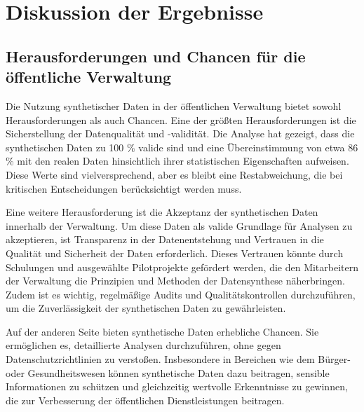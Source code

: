 \chapter{Diskussion der Ergebnisse}
\label{cha:diskussion}

\section{Herausforderungen und Chancen für die öffentliche Verwaltung}
\begin{spacing}{1.5}

Die Nutzung synthetischer Daten in der öffentlichen Verwaltung bietet sowohl Herausforderungen als auch Chancen. Eine der größten Herausforderungen ist die Sicherstellung der Datenqualität und -validität. Die Analyse hat gezeigt, dass die synthetischen Daten zu 100 \% valide sind und eine Übereinstimmung von etwa 86 \% mit den realen Daten hinsichtlich ihrer statistischen Eigenschaften aufweisen. Diese Werte sind vielversprechend, aber es bleibt eine Restabweichung, die bei kritischen Entscheidungen berücksichtigt werden muss.

Eine weitere Herausforderung ist die Akzeptanz der synthetischen Daten innerhalb der Verwaltung. Um diese Daten als valide Grundlage für Analysen zu akzeptieren, ist Transparenz in der Datenentstehung und Vertrauen in die Qualität und Sicherheit der Daten erforderlich. Dieses Vertrauen könnte durch Schulungen und ausgewählte Pilotprojekte gefördert werden, die den Mitarbeitern der Verwaltung die Prinzipien und Methoden der Datensynthese näherbringen. Zudem ist es wichtig, regelmäßige Audits und Qualitätskontrollen durchzuführen, um die Zuverlässigkeit der synthetischen Daten zu gewährleisten.

Auf der anderen Seite bieten synthetische Daten erhebliche Chancen. Sie ermöglichen es, detaillierte Analysen durchzuführen, ohne gegen Datenschutzrichtlinien zu verstoßen. Insbesondere in Bereichen wie dem Bürger- oder Gesundheitswesen können synthetische Daten dazu beitragen, sensible Informationen zu schützen und gleichzeitig wertvolle Erkenntnisse zu gewinnen, die zur Verbesserung der öffentlichen Dienstleistungen beitragen.

\end{spacing}

